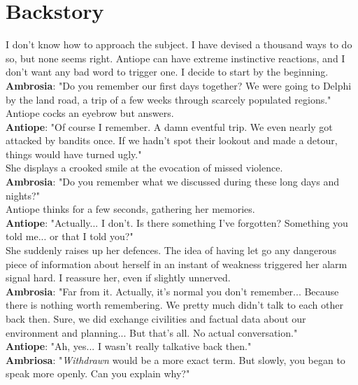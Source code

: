 \documentclass{report}
\newcommand{\speaker}[1]{
	\textbf{#1}: 
}
\newcommand{\gsection}[1]{
	\section*{#1}
	\label{#1}
}
\begin{document}
\gsection{Backstory}

I don't know how to approach the subject. I have devised a thousand ways to do so, but none seems right. Antiope can have extreme instinctive reactions, and I don't want any bad word to trigger one. I decide to start by the beginning.\\

\speaker{Ambrosia} "Do you remember our first days together? We were going to Delphi by the land road, a trip of a few weeks through scarcely populated regions."\\

Antiope cocks an eyebrow but answers.\\

\speaker{Antiope} "Of course I remember. A damn eventful trip. We even nearly got attacked by bandits once. If we hadn't spot their lookout and made a detour, things would have turned ugly."\\

She displays a crooked smile at the evocation of missed violence.\\

\speaker{Ambrosia} "Do you remember what we discussed during these long days and nights?"\\

Antiope thinks for a few seconds, gathering her memories.\\

\speaker{Antiope} "Actually... I don't. Is there something I've forgotten? Something you told me... or that I told you?"\\

She suddenly raises up her defences. The idea of having let go any dangerous piece of information about herself in an instant of weakness triggered her alarm signal hard. I reassure her, even if slightly unnerved.\\

\speaker{Ambrosia} "Far from it. Actually, it's normal you don't remember... Because there is nothing worth remembering. We pretty much didn't talk to each other back then. Sure, we did exchange civilities and factual data about our environment and planning... But that's all. No actual conversation."\\

\speaker{Antiope} "Ah, yes... I wasn't really talkative back then."\\

\speaker{Ambriosa} "\emph{Withdrawn} would be a more exact term. But slowly, you began to speak more openly. Can you explain why?"\\
\end{document}

